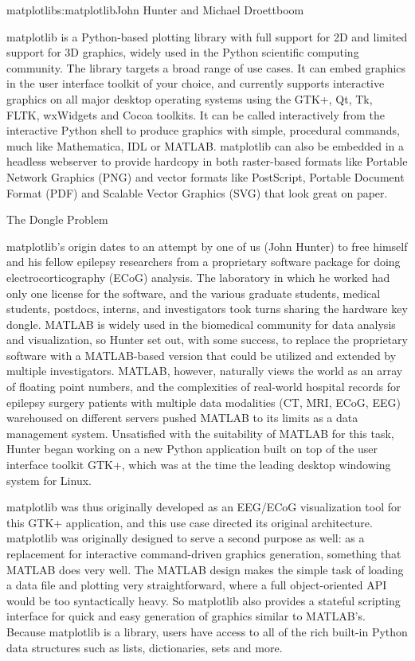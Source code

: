 \begin{aosachapter}{matplotlib}{s:matplotlib}{John Hunter and Michael Droettboom}

matplotlib is a Python-based plotting library with full support for 
2D and limited support for 3D graphics, widely used in
the Python scientific computing community.  The library targets a broad range of
use cases.  It can embed graphics in the user interface toolkit of
your choice, and currently supports interactive graphics on all major
desktop operating systems using the GTK+, Qt, Tk, FLTK, wxWidgets and
Cocoa toolkits.  It can be called interactively from the
interactive Python shell to produce graphics with simple, procedural
commands, much like Mathematica, IDL or
MATLAB.  matplotlib can also be embedded in a headless
webserver to provide hardcopy in both raster-based formats like
Portable Network Graphics (PNG) and vector formats like
PostScript, Portable Document Format (PDF) and Scalable Vector
Graphics (SVG) that look great on paper.

\begin{aosasect1}{The Dongle Problem}

matplotlib's origin dates to an attempt by one of us (John Hunter) to
free himself and his fellow epilepsy researchers from a proprietary
software package for doing electrocorticography (ECoG) analysis.  The
laboratory in which he worked had only one license for the software,
and the various graduate students, medical students, postdocs, interns,
and investigators took turns sharing the hardware key dongle.
MATLAB is widely used in the biomedical community for
data analysis and visualization, so Hunter set out, with some success,
to replace the proprietary software with a MATLAB-based version that
could be utilized and extended by multiple investigators.  MATLAB,
however, naturally views the world as an array of floating point
numbers, and the complexities of real-world hospital records for
epilepsy surgery patients with multiple data modalities (CT, MRI,
ECoG, EEG) warehoused on different servers pushed MATLAB to its limits
as a data management system.  Unsatisfied with the suitability of
MATLAB for this task, Hunter began working on a new Python application
built on top of the user interface toolkit GTK+, which was at the time
the leading desktop windowing system for Linux.

matplotlib was thus originally developed as an EEG/ECoG visualization
tool for this GTK+ application, and this use case directed its
original architecture.  matplotlib was originally designed to serve a
second purpose as well: as a replacement for interactive command-driven 
graphics generation, something that MATLAB does very well.  The
MATLAB design makes the simple task of loading a data file and
plotting very straightforward, where a full object-oriented API would
be too syntactically heavy.  So matplotlib also provides a stateful
scripting interface for quick and easy generation of graphics similar
to MATLAB's.  Because matplotlib is a library, users have access to
all of the rich built-in Python data structures such as lists,
dictionaries, sets and more.


\end{aosasect1}
\end{aosachapter}
